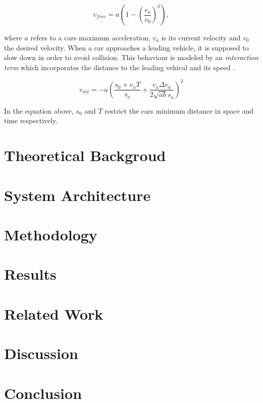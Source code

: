 \documentclass[10pt]{article}
\begin{document}
\begin{equation}
	v_{free} = a ( 1 - ( \frac{v_a}{v_0} )^\delta),
\end{equation}

where $a$ refers to a cars maximum acceleration, $v_a$ is its current velocity and $v_0$ the desired velocity. When a car approaches a leading vehicle, it is supposed to slow down in order to avoid collision. This behaviour is modeled by an \textit{interaction term} which incorporates the distance to the leading vehical and its speed \citep{treiber2000congested}. 

\begin{equation}
	v_{int} = - a ( \frac{s_0 + v_a T}{s_a} + \frac{v_a \Delta v_a}{2 \sqrt{ab} s_a} )^2
\end{equation}

In the equation above, $s_0$ and $T$ restrict the cars minimum distance in space and time respectively.

\section{Theoretical Backgroud}
	
\section{System Architecture}
	
\section{Methodology}

\section{Results}

\section{Related Work}

\section{Discussion}
	
\section{Conclusion}

{\tiny\printbibliography}
\end{document}
